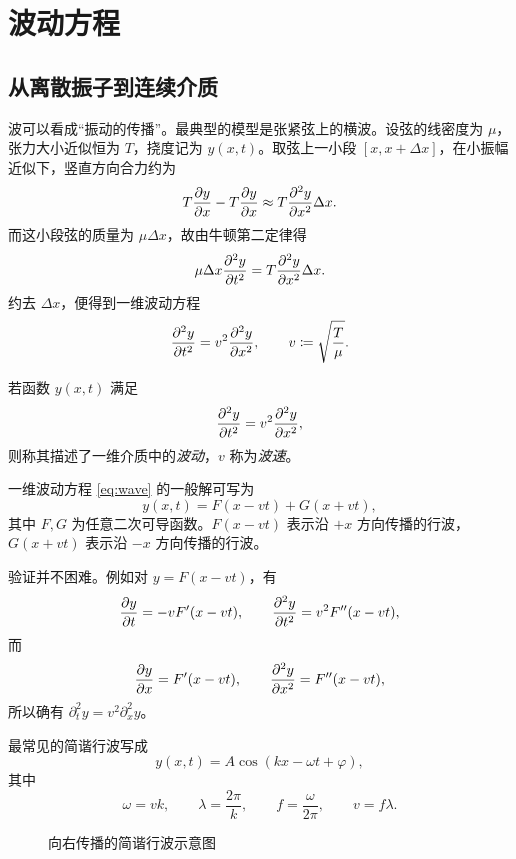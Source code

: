 \section{波动方程}

\subsection{从离散振子到连续介质}

波可以看成“振动的传播”。最典型的模型是张紧弦上的横波。设弦的线密度为 $\mu$，张力大小近似恒为 $T$，挠度记为 $y(x,t)$。取弦上一小段 $[x,x+\Delta x]$，在小振幅近似下，竖直方向合力约为
\[
T\pdv{y}{x}(x+\Delta x,t)-T\pdv{y}{x}(x,t)
\approx T\pdv[2]{y}{x}\Delta x.
\]
而这小段弦的质量为 $\mu\Delta x$，故由牛顿第二定律得
\[
\mu\Delta x\pdv[2]{y}{t}=T\pdv[2]{y}{x}\Delta x.
\]
约去 $\Delta x$，便得到一维波动方程
\begin{equation}
\pdv[2]{y}{t}=v^2\pdv[2]{y}{x},
\qquad
v\coloneqq \sqrt{\frac{T}{\mu}}.
\label{eq:wave}
\end{equation}

\begin{definition}
若函数 $y(x,t)$ 满足
\[
\pdv[2]{y}{t}=v^2\pdv[2]{y}{x},
\]
则称其描述了一维介质中的\emph{波动}，$v$ 称为\emph{波速}。
\end{definition}

\begin{theorem}
一维波动方程 \eqref{eq:wave} 的一般解可写为
\begin{equation}
 y(x,t)=F(x-vt)+G(x+vt),
\label{eq:dalembert}
\end{equation}
其中 $F,G$ 为任意二次可导函数。$F(x-vt)$ 表示沿 $+x$ 方向传播的行波，$G(x+vt)$ 表示沿 $-x$ 方向传播的行波。
\end{theorem}

验证并不困难。例如对 $y=F(x-vt)$，有
\[
\pdv{y}{t}=-vF'(x-vt),
\qquad
\pdv[2]{y}{t}=v^2F''(x-vt),
\]
而
\[
\pdv{y}{x}=F'(x-vt),
\qquad
\pdv[2]{y}{x}=F''(x-vt),
\]
所以确有 $\partial_t^2 y=v^2\partial_x^2 y$。

最常见的简谐行波写成
\begin{equation}
 y(x,t)=A\cos(kx-\omega t+\varphi),
\label{eq:harmonic-wave}
\end{equation}
其中
\[
\omega=vk,
\qquad
\lambda=\frac{2\pi}{k},
\qquad
f=\frac{\omega}{2\pi},
\qquad
v=f\lambda.
\]

\begin{figure}[H]
\centering
{}
\caption{向右传播的简谐行波示意图}
\end{figure}

